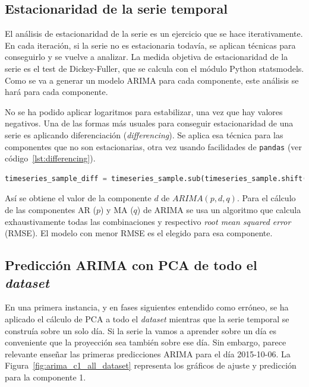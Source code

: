 \documentclass[11pt,spanish,listoffigures,listoftables]{tfgetsinf}
\begin{document}
        \subsection{Estacionaridad de la serie temporal}
        El análisis de estacionaridad de la serie es un ejercicio que se hace iterativamente. En cada iteración, si la serie no es estacionaria todavía, se aplican técnicas para conseguirlo y se vuelve a analizar. La medida objetiva de estacionaridad de la serie es el test de Dickey-Fuller, que se calcula con el módulo Python {statsmodels}. Como se va a generar un modelo ARIMA para cada componente, este análisis se hará para cada componente.
        
        No se ha podido aplicar logaritmos para estabilizar, una vez que hay valores negativos. Una de las formas más usuales para conseguir estacionaridad de una serie es aplicando diferenciación ({\em differencing}). Se aplica esa técnica para las componentes que no son estacionarias, otra vez usando facilidades de {\tt pandas} (ver código~\ref{lst:differencing}).
                
        \begin{lstlisting}[language=Python, caption=Diferenciación de la serie usando {\tt pandas}., label={lst:differencing}]
timeseries_sample_diff = timeseries_sample.sub(timeseries_sample.shift())
        \end{lstlisting}
        
        Así se obtiene el valor de la componente \(d\) de \(ARIMA(p, d, q)\). Para el cálculo de las componentes AR (\(p\)) y MA (\(q\)) de ARIMA se usa un algoritmo que calcula exhaustivamente todas las combinaciones y respectivo {\em root mean squared error} (RMSE). El modelo con menor RMSE es el elegido para esa componente.
        
        \subsection{Predicción ARIMA con PCA de todo el {\em dataset}}
        En una primera instancia, y en fases siguientes entendido como erróneo, se ha aplicado el cálculo de PCA a todo el {\em dataset} mientras que la serie temporal se construía sobre un solo día. Si la serie la vamos a aprender sobre un día es conveniente que la proyección sea también sobre ese día. Sin embargo, parece relevante enseñar las primeras predicciones ARIMA para el día 2015-10-06. La Figura~\ref{fig:arima_c1_all_dataset} representa los gráficos de ajuste y predicción para la componente 1.
        
\end{document}

